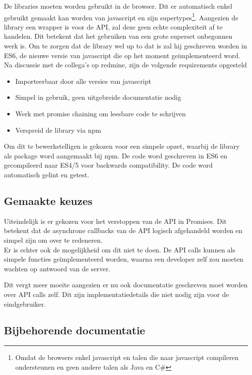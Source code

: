 De libraries moeten worden gebruikt in de browser. Dit er automatisch enkel gebruikt gemaakt kan worden van javascript en zijn supertypes\footnote{Omdat de browsers enkel javascript en talen die naar javascript compileren ondersteunen en geen andere talen als Java en C\#}. Aangezien de library een wrapper is voor de API, zal deze geen echte complexiteit af te handelen. Dit betekent dat het gebruiken van een grote superset onbegonnen werk is. Om te zorgen dat de library wel up to dat is zal hij geschreven worden  in ES6, de nieuwe versie van javascript die op het moment geimplementeerd word. \\

Na discussie met de collega's op redmine, zijn de volgende requirements opgesteld 	 

\begin{itemize}
	\item Importeerbaar door alle versies van javascript
	\item Simpel in gebruik, geen uitgebreide documentatie nodig
	\item Werk met promise chaining om leesbare code te schrijven
	\item Verspreid de library via npm
\end{itemize}

Om dit te bewerkstelligen is gekozen voor een simpele opzet, waarbij de library als package word aangemaakt bij npm. De code word geschreven in ES6 en gecompileerd naar ES4/5 voor backwards compatibility. De code word automatisch gelint en getest.

\subsection{Gemaakte keuzes}

Uiteindelijk is er gekozen voor het verstoppen van de API in Promises. Dit betekent dat de asynchrone callbacks van de API logisch afgehandeld worden en simpel zijn om over te redeneren. \\

Er is echter ook de mogelijkheid om dit niet te doen. De API calls kunnen als simpele functies ge{\"i}mplementeerd worden, waarna een developer zelf zou moeten wachten op antwoord van de server. 

Dit vergt meer moeite aangezien er nu ook documentatie geschreven moet worden over API calls zelf. Dit zijn implementatiedetails die niet nodig zijn voor de eindgebruiker.

\subsection{Bijbehorende documentatie}


